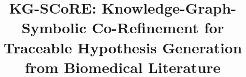 \documentclass[sigconf,anonymous,review]{acmart}
\begin{document}
\title{KG-SCoRE: Knowledge-Graph-Symbolic Co-Refinement for Traceable Hypothesis Generation from Biomedical Literature}

\begin{abstract}

\end{abstract}

\maketitle









\end{document}

